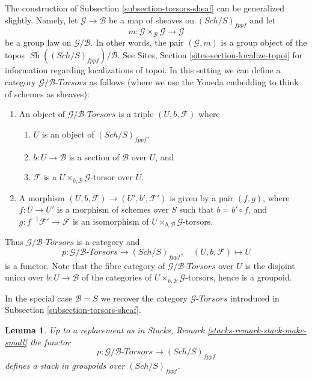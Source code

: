 \documentclass{stacks-project}
\theoremstyle{plain}
\newtheorem{lemma}[subsection]{Lemma}
\theoremstyle{definition}
\theoremstyle{remark}
\numberwithin{equation}{subsection}
\def\Sch{\mathit{Sch}}
\def\Sh{\mathop{\mathit{Sh}}\nolimits}
\begin{document}
\noindent
The construction of
Subsection \ref{subsection-torsors-sheaf}
can be generalized slightly.
Namely, let $\mathcal{G} \to \mathcal{B}$ be a map of sheaves
on $(\Sch/S)_{fppf}$ and let
$$
m :
\mathcal{G} \times_\mathcal{B} \mathcal{G}
\longrightarrow
\mathcal{G}
$$
be a group law on $\mathcal{G}/\mathcal{B}$. In other words, the pair
$(\mathcal{G}, m)$ is a group object of the topos
$\Sh((\Sch/S)_{fppf})/\mathcal{B}$. See
Sites, Section \ref{sites-section-localize-topoi}
for information regarding localizations of topoi.
In this setting we can define a category
$\mathcal{G}/\mathcal{B}\textit{-Torsors}$ as follows
(where we use the Yoneda embedding to think of schemes as sheaves):
\begin{enumerate}
\item An object of $\mathcal{G}/\mathcal{B}\textit{-Torsors}$ is a triple
$(U, b, \mathcal{F})$ where
\begin{enumerate}
\item $U$ is an object of $(\Sch/S)_{fppf}$,
\item $b : U \to \mathcal{B}$ is a section of $\mathcal{B}$ over $U$, and
\item $\mathcal{F}$ is a $U \times_{b, \mathcal{B}}\mathcal{G}$-torsor
over $U$.
\end{enumerate}
\item A morphism $(U, b, \mathcal{F}) \to (U', b', \mathcal{F}')$ is given
by a pair $(f, g)$, where $f : U \to U'$ is a morphism of schemes
over $S$ such that $b = b' \circ f$, and
$g : f^{-1}\mathcal{F}' \to \mathcal{F}$ is an
isomorphism of $U \times_{b, \mathcal{B}} \mathcal{G}$-torsors.
\end{enumerate}
Thus $\mathcal{G}/\mathcal{B}\textit{-Torsors}$ is a category and
$$
p :
\mathcal{G}/\mathcal{B}\textit{-Torsors}
\longrightarrow
(\Sch/S)_{fppf},
\quad
(U, b, \mathcal{F}) \longmapsto U
$$
is a functor. Note that the fibre category of
$\mathcal{G}/\mathcal{B}\textit{-Torsors}$
over $U$ is the disjoint union over $b : U \to \mathcal{B}$
of the categories of $U \times_{b, \mathcal{B}} \mathcal{G}$-torsors,
hence is a groupoid.

\medskip\noindent
In the special case $\mathcal{B} = S$ we recover the category
$\mathcal{G}\textit{-Torsors}$ introduced in
Subsection \ref{subsection-torsors-sheaf}.

\begin{lemma}
\label{lemma-variant-torsors-sheaf-stack-in-groupoids}
Up to a replacement as in
Stacks, Remark \ref{stacks-remark-stack-make-small}
the functor
$$
p :
\mathcal{G}/\mathcal{B}\textit{-Torsors}
\longrightarrow
(\Sch/S)_{fppf}
$$
defines a stack in groupoids over $(\Sch/S)_{fppf}$.
\end{lemma}
\end{document}
